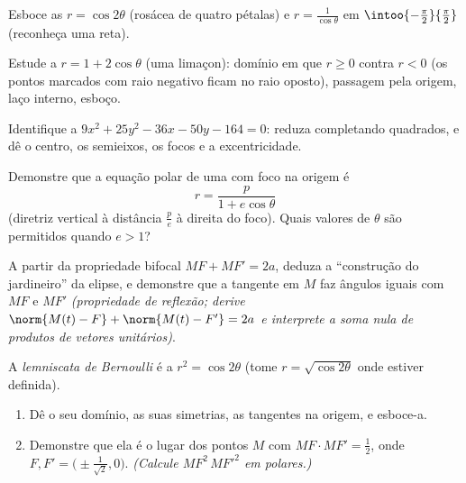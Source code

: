 \begin{exercise}[$\star$]\label{exo:b1:curves:4}
Esboce as  $r = \cos 2\theta$ (rosácea de quatro pétalas) e $r = \frac{1}{\cos\theta}$ em
$\intoo{-\frac\pi2}{\frac\pi2}$ (reconheça uma reta).
\end{exercise}

\begin{exercise}[$\star\star$]\label{exo:b1:curves:5}
Estude a  $r = 1 + 2\cos\theta$ (uma limaçon): domínio em que $r \geq 0$ contra
$r < 0$ (os pontos marcados com raio negativo ficam no raio oposto),
passagem pela origem, laço interno, esboço.
\end{exercise}

\begin{exercise}[$\star\star$]\label{exo:b1:curves:6}
Identifique a  $9x^2 + 25y^2 - 36x - 50y - 164 = 0$: reduza completando quadrados, e dê o
centro, os semieixos, os focos e a excentricidade.
\end{exercise}

\begin{exercise}[$\star\star$]\label{exo:b1:curves:7}
Demonstre que a equação polar de uma  com foco na origem é
\[
r = \frac{p}{1 + e\cos\theta}
\]
(diretriz vertical à distância $\frac pe$ à direita do foco). Quais
valores de $\theta$ são permitidos quando $e > 1$?
\end{exercise}

\begin{exercise}[$\star\star$]\label{exo:b1:curves:8}
A partir da propriedade bifocal $MF + MF' = 2a$, deduza a ``construção do
jardineiro'' da elipse, e demonstre que a tangente em $M$ faz ângulos
iguais com $MF$ e $MF'$ \emph{(propriedade de reflexão; derive $\norm{M(t) - F} + \norm{M(t) - F'} = 2a$
e interprete a soma nula de produtos de vetores unitários)}.
\end{exercise}

\begin{exercise}[$\star\star\star$]\label{exo:b1:curves:9}
A \emph{lemniscata de Bernoulli} é a  $r^2 = \cos
2\theta$ (tome $r = \sqrt{\cos2\theta}$
onde estiver definida).
\begin{enumerate}
  \item Dê o seu domínio, as suas simetrias, as tangentes na origem,
        e esboce-a.
  \item Demonstre que ela é o lugar dos pontos $M$ com $MF \cdot MF'
        = \frac12$, onde
        $F, F' = \bigl(\pm\frac{1}{\sqrt2},
        0\bigr)$. \emph{(Calcule $MF^2\,MF'^2$ em  polares.)}
\end{enumerate}
\end{exercise}

